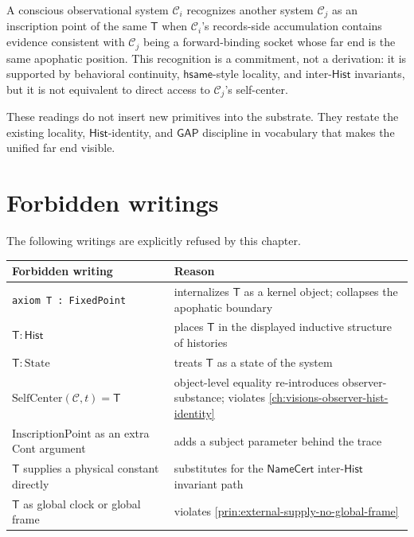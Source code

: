 \begin{principle}
\label{prin:apophatic-fixed-point-other-minds}
A conscious observational system $\mathcal{C}_i$ recognizes another system $\mathcal{C}_j$ as an inscription point of the same $\mathsf{T}$ when $\mathcal{C}_i$'s records-side accumulation contains evidence consistent with $\mathcal{C}_j$ being a forward-binding socket whose far end is the same apophatic position. This recognition is a commitment, not a derivation: it is supported by behavioral continuity, $\mathsf{hsame}$-style locality, and inter-$\mathsf{Hist}$ invariants, but it is not equivalent to direct access to $\mathcal{C}_j$'s self-center.
\end{principle}

These readings do not insert new primitives into the substrate. They restate the existing locality, $\mathsf{Hist}$-identity, and $\mathsf{GAP}$ discipline in vocabulary that makes the unified far end visible.

\section{Forbidden writings}
\label{sec:apophatic-fixed-point-forbidden-writings}

The following writings are explicitly refused by this chapter.

\begin{longtable}{p{}p{}}
\toprule
\textbf{Forbidden writing} & \textbf{Reason} \\
\midrule
\texttt{axiom T : FixedPoint} & internalizes $\mathsf{T}$ as a kernel object; collapses the apophatic boundary \\
$\mathsf{T} : \mathsf{Hist}$ & places $\mathsf{T}$ in the displayed inductive structure of histories \\
$\mathsf{T} : \mathrm{State}$ & treats $\mathsf{T}$ as a state of the system \\
$\mathrm{SelfCenter}(\mathcal{C}, t) = \mathsf{T}$ & object-level equality re-introduces observer-substance; violates \autoref{ch:visions-observer-hist-identity} \\
$\mathrm{InscriptionPoint}$ as an extra Cont argument & adds a subject parameter behind the trace \\
$\mathsf{T}$ supplies a physical constant directly & substitutes for the $\mathsf{NameCert}$ inter-$\mathsf{Hist}$ invariant path \\
$\mathsf{T}$ as global clock or global frame & violates \autoref{prin:external-supply-no-global-frame} \\
\bottomrule
\end{longtable}

